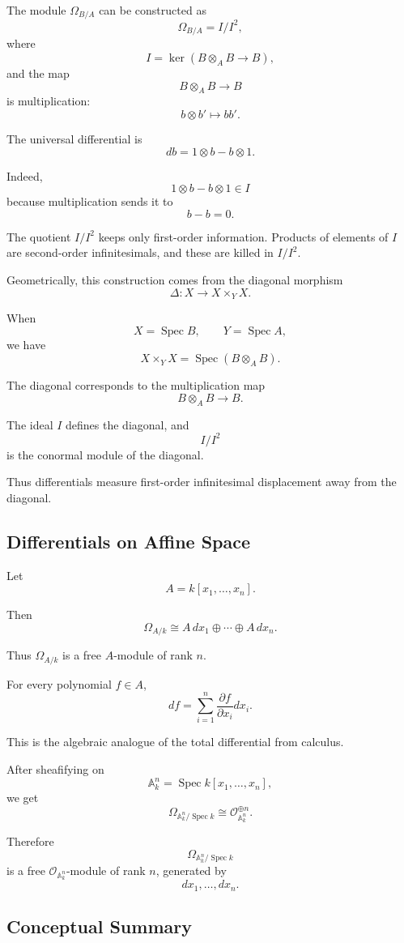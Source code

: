 The module $\Omega_{B/A}$ can be constructed as
\[
\Omega_{B/A}=I/I^2,
\]
where
\[
I=\ker(B\otimes_A B\to B),
\]
and the map
\[
B\otimes_A B\to B
\]
is multiplication:
\[
b\otimes b'\longmapsto bb'.
\]

The universal differential is
\[
db=1\otimes b-b\otimes1.
\]

Indeed,
\[
1\otimes b-b\otimes1\in I
\]
because multiplication sends it to
\[
b-b=0.
\]

The quotient $I/I^2$ keeps only first-order information. Products of elements
of $I$ are second-order infinitesimals, and these are killed in $I/I^2$.

Geometrically, this construction comes from the diagonal morphism
\[
\Delta:X\to X\times_Y X.
\]

When
\[
X=\operatorname{Spec}B,
\qquad
Y=\operatorname{Spec}A,
\]
we have
\[
X\times_Y X=\operatorname{Spec}(B\otimes_A B).
\]

The diagonal corresponds to the multiplication map
\[
B\otimes_A B\to B.
\]

The ideal $I$ defines the diagonal, and
\[
I/I^2
\]
is the conormal module of the diagonal.

Thus differentials measure first-order infinitesimal displacement away from
the diagonal.

\subsection{Differentials on Affine Space}

Let
\[
A=k[x_1,\ldots,x_n].
\]

Then
\[
\Omega_{A/k}
\cong
A\,dx_1\oplus\cdots\oplus A\,dx_n.
\]

Thus $\Omega_{A/k}$ is a free $A$-module of rank $n$.

For every polynomial $f\in A$,
\[
df
=
\sum_{i=1}^n
\frac{\partial f}{\partial x_i}dx_i.
\]

This is the algebraic analogue of the total differential from calculus.

After sheafifying on
\[
\mathbb A_k^n=\operatorname{Spec}k[x_1,\ldots,x_n],
\]
we get
\[
\Omega_{\mathbb A_k^n/\operatorname{Spec}k}
\cong
\mathcal O_{\mathbb A_k^n}^{\oplus n}.
\]

Therefore
\[
\Omega_{\mathbb A_k^n/\operatorname{Spec}k}
\]
is a free $\mathcal O_{\mathbb A_k^n}$-module of rank $n$, generated by
\[
dx_1,\ldots,dx_n.
\]

\subsection{Conceptual Summary}

